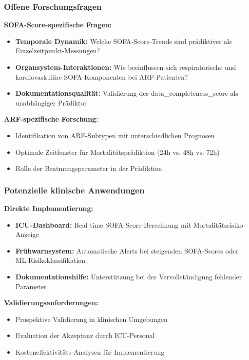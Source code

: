\documentclass[12pt]{article}
\begin{document}
\subsubsection{Offene Forschungsfragen}

\textbf{SOFA-Score-spezifische Fragen:}
\begin{itemize}
    \item \textbf{Temporale Dynamik:} Welche SOFA-Score-Trends sind prädiktiver als Einzelzeitpunkt-Messungen?
    \item \textbf{Organsystem-Interaktionen:} Wie beeinflussen sich respiratorische und kardiovaskuläre SOFA-Komponenten bei ARF-Patienten?
    \item \textbf{Dokumentationsqualität:} Validierung des data\_completeness\_score als unabhängiger Prädiktor
\end{itemize}

\textbf{ARF-spezifische Forschung:}
\begin{itemize}
    \item Identifikation von ARF-Subtypen mit unterschiedlichen Prognosen
    \item Optimale Zeitfenster für Mortalitätsprädiktion (24h vs. 48h vs. 72h)
    \item Rolle der Beatmungsparameter in der Prädiktion
\end{itemize}

\subsubsection{Potenzielle klinische Anwendungen}

\textbf{Direkte Implementierung:}
\begin{itemize}
    \item \textbf{ICU-Dashboard:} Real-time SOFA-Score-Berechnung mit Mortalitätsrisiko-Anzeige
    \item \textbf{Frühwarnsystem:} Automatische Alerts bei steigenden SOFA-Scores oder ML-Risikoklassifikation
    \item \textbf{Dokumentationshilfe:} Unterstützung bei der Vervollständigung fehlender Parameter
\end{itemize}

\textbf{Validierungsanforderungen:}
\begin{itemize}
    \item Prospektive Validierung in klinischen Umgebungen
    \item Evaluation der Akzeptanz durch ICU-Personal
    \item Kosteneffektivitäts-Analysen für Implementierung
\end{itemize}
\end{document}
